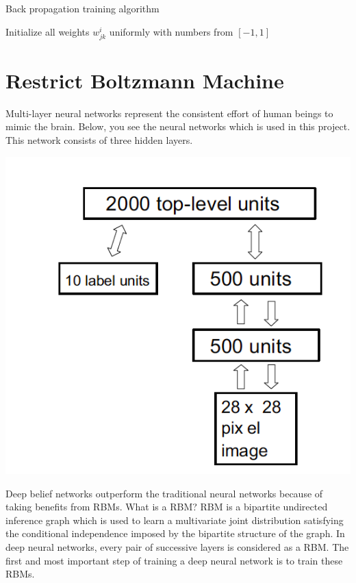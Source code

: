 \documentclass{article} %
\begin{document}
\begin{algorithm}[H]
    \begin{center}
    Back propagation training algorithm
    \end{center}

    Initialize all weights $w_{jk}^i$ uniformly with numbers from $[-1,1]$\;

\end{algorithm}
\section{Restrict Boltzmann Machine}
Multi-layer neural networks represent the consistent effort of human beings to mimic the brain. Below, you see the neural networks which is used in this project. This network consists of three hidden layers.
\begin{center}
\includegraphics[width=0.6\linewidth]{DNN.png}
\end{center}
Deep belief networks outperform the traditional neural networks  because of taking benefits from RBMs. 
What is a RBM? 
RBM is a bipartite undirected inference graph which is used to learn a multivariate joint distribution satisfying the conditional independence imposed by the bipartite structure of the graph. 
In deep neural networks, every pair of successive layers is considered as a RBM. 
The first and most important step of training a deep neural network is to train these RBMs.
\end{document}
